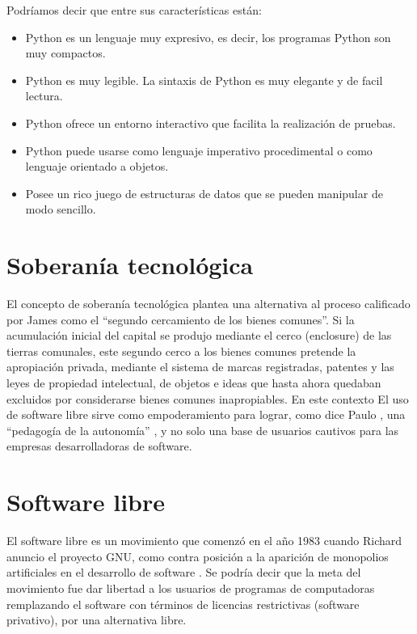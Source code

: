 Podríamos decir que entre sus características \citep[pág 15]{marzal2004introduccion} están: 

\begin{itemize}
  \item Python es un lenguaje muy expresivo, es decir, los programas Python son muy compactos.
  \item Python es muy legible. La sintaxis de Python es muy elegante y de facil lectura.
  \item Python ofrece un entorno interactivo que facilita la realización de pruebas.
  \item Python puede usarse como lenguaje imperativo procedimental o como lenguaje orientado a objetos.
  \item Posee un rico juego de estructuras de datos que se pueden manipular de modo sencillo.
 
\end{itemize}

\section{Soberanía tecnológica}

El concepto de soberanía tecnológica plantea una alternativa al proceso calificado por James \citet{boyle_second_2003} como el “segundo cercamiento de los bienes comunes”. Si la acumulación inicial del capital se produjo mediante el cerco (enclosure) de las tierras comunales, este segundo cerco a los bienes comunes pretende la apropiación privada, mediante el sistema de marcas registradas, patentes y las leyes de propiedad intelectual, de objetos e ideas que hasta ahora quedaban excluidos por considerarse bienes comunes inapropiables. En este contexto El uso de software libre sirve como empoderamiento para lograr, como dice Paulo \citet{freire_pedagogiautonomi:_2006}, una “pedagogía de la autonomía” , y no solo una base de usuarios cautivos para las empresas desarrolladoras de software. 

\section{Software libre}

El software libre es un movimiento que comenzó en el año 1983 cuando Richard \cite{stallman_software_2007} anuncio el proyecto GNU, como contra posición a la aparición de monopolios artificiales en el desarrollo de software \citep{beatriz_busaniche_argentina_2010}. Se podría decir que la meta del movimiento fue dar libertad a los usuarios de programas de computadoras remplazando el software con términos de licencias restrictivas (software privativo),  por una alternativa libre.


